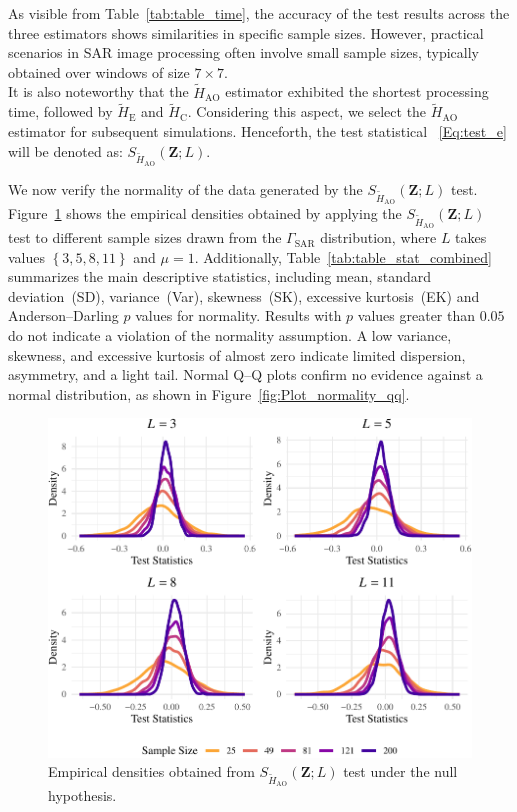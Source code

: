 \documentclass[remotesensing,article,submit,moreauthors,pdftex]{Definitions/mdpi}
\providecommand{\DIFaddbeginFL}{} %
\providecommand{\DIFaddendFL}{} %
\providecommand{\DIFdelbeginFL}{} %
\providecommand{\DIFdelendFL}{} %
\newcommand{\DIFscaledelfig}{0.5}
\newlength{\DIFdelgraphicswidth} %
\newlength{\DIFdelgraphicsheight} %
\newcommand{\DIFaddincludegraphics}[2][]{{\color{blue}\fbox{\DIFOincludegraphics[#1]{#2}}}} %
\newcommand{\DIFdelincludegraphics}[2][]{%
\sbox{\DIFdelgraphicsbox}{\DIFOincludegraphics[#1]{#2}}%
\settoboxwidth{\DIFdelgraphicswidth}{\DIFdelgraphicsbox} %
\settoboxtotalheight{\DIFdelgraphicsheight}{\DIFdelgraphicsbox} %
\scalebox{\DIFscaledelfig}{%
\parbox[b]{\DIFdelgraphicswidth}{\usebox{\DIFdelgraphicsbox}\\[-\baselineskip] \rule{\DIFdelgraphicswidth}{0em}}\llap{\resizebox{\DIFdelgraphicswidth}{\DIFdelgraphicsheight}{%
\setlength{\unitlength}{\DIFdelgraphicswidth}%
\begin{picture}(1,1)%
\thicklines\linethickness{2pt} %
{\color[rgb]{1,0,0}\put(0,0){\framebox(1,1){}}}%
{\color[rgb]{1,0,0}\put(0,0){\line( 1,1){1}}}%
{\color[rgb]{1,0,0}\put(0,1){\line(1,-1){1}}}%
\end{picture}%
}\hspace*{3pt}}} %
} %
\DeclareRobustCommand{\DIFaddbeginFL}{\DIFOaddbeginFL \let\includegraphics\DIFaddincludegraphics} %
\DeclareRobustCommand{\DIFaddendFL}{\DIFOaddendFL \let\includegraphics\DIFOincludegraphics} %
\DeclareRobustCommand{\DIFdelbeginFL}{\DIFOdelbeginFL \let\includegraphics\DIFdelincludegraphics} %
\DeclareRobustCommand{\DIFdelendFL}{\DIFOaddendFL \let\includegraphics\DIFOincludegraphics} %
\begin{document}
As visible from Table~\ref{tab:table_time}, the accuracy of the test
results across the three estimators shows similarities in specific
sample sizes. However, practical scenarios in SAR image processing often
involve small sample sizes, typically obtained over windows of size
\(7\times7\).\\
It is also noteworthy that the \(\widetilde{H}_{\text{AO}}\) estimator
exhibited the shortest processing time, followed by
\(\widetilde{H}_{\text{E}}\) and \(\widetilde{H}_{\text{C}}\).
Considering this aspect, we select the \(\widetilde{H}_{\text{AO}}\)
estimator for subsequent simulations. Henceforth, the test statistical
~\eqref{Eq:test_e} will be denoted as:
\(S_{\widetilde{H}_{\text{AO}}}(\bm{Z}; L)\).

We now verify the normality of the data generated by the
\(S_{\widetilde{H}_{\text{AO}}}(\bm{Z}; L)\) test.
Figure~\ref{fig:Plot_density} shows the empirical densities obtained by
applying the \(S_{\widetilde{H}_{\text{AO}}}(\bm{Z}; L)\) test to
different sample sizes drawn from the \(\Gamma_{\text{SAR}}\)
distribution, where \(L\) takes values \(\left\{3,5, 8,11\right\}\) and
\(\mu=1\). Additionally, Table~\ref{tab:table_stat_combined} summarizes
the main descriptive statistics, including mean, standard
deviation~(SD), variance~(Var), skewness~(SK), excessive kurtosis~(EK)
and Anderson--Darling \(p\) values for normality. Results with \(p\)
values greater than \(0.05\) do not indicate a violation of the
normality assumption. A low variance, skewness, and excessive kurtosis
of almost zero indicate limited dispersion, asymmetry, and a light tail.
Normal Q--Q plots confirm no evidence against a normal distribution, as
shown in Figure~\ref{fig:Plot_normality_qq}.

\begin{figure}[hbt]
\DIFdelbeginFL %
\DIFdelendFL \DIFaddbeginFL \includegraphics[width=0.95\linewidth]{R1-Identifying-Heterogeneity-in-SAR-Data-with-New-Test-Statistics_files/figure-latex/Plot_density-1} \DIFaddendFL \caption{Empirical densities obtained from $S_{\widetilde{H}_{\text{AO}}}(\bm{Z}; L)$ test under the null hypothesis.}\label{fig:Plot_density}
\end{figure}
\end{document}
